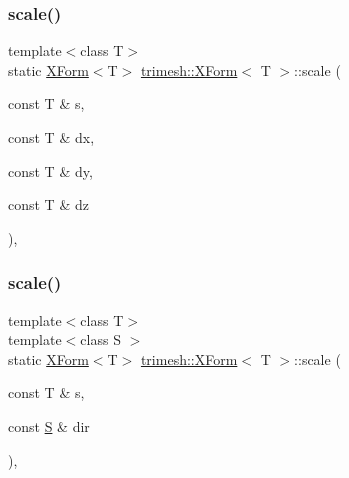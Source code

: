 \subsubsection{\texorpdfstring{scale()}{scale()}\hspace{0.1cm}{\footnotesize\ttfamily [3/4]}}
{\footnotesize\ttfamily template$<$class T$>$ \\
static \hyperlink{classtrimesh_1_1XForm}{X\+Form}$<$T$>$ \hyperlink{classtrimesh_1_1XForm}{trimesh\+::\+X\+Form}$<$ T $>$\+::scale (\begin{DoxyParamCaption}\item[{const T \&}]{s,  }\item[{const T \&}]{dx,  }\item[{const T \&}]{dy,  }\item[{const T \&}]{dz }\end{DoxyParamCaption})\hspace{0.3cm}{\ttfamily [inline]}, {\ttfamily [static]}}

\mbox{\label{classtrimesh_1_1XForm_ab127af613059fa850b24fbd864f0ab18}} 
\subsubsection{\texorpdfstring{scale()}{scale()}\hspace{0.1cm}{\footnotesize\ttfamily [4/4]}}
{\footnotesize\ttfamily template$<$class T$>$ \\
template$<$class S $>$ \\
static \hyperlink{classtrimesh_1_1XForm}{X\+Form}$<$T$>$ \hyperlink{classtrimesh_1_1XForm}{trimesh\+::\+X\+Form}$<$ T $>$\+::scale (\begin{DoxyParamCaption}\item[{const T \&}]{s,  }\item[{const \hyperlink{ego_8cc_abde73cd36321648268fb4543509b996a}{S} \&}]{dir }\end{DoxyParamCaption})\hspace{0.3cm}{\ttfamily [inline]}, {\ttfamily [static]}}

\mbox{\label{classtrimesh_1_1XForm_a9194a9092400c8def3bad6cb71224de4}} 
